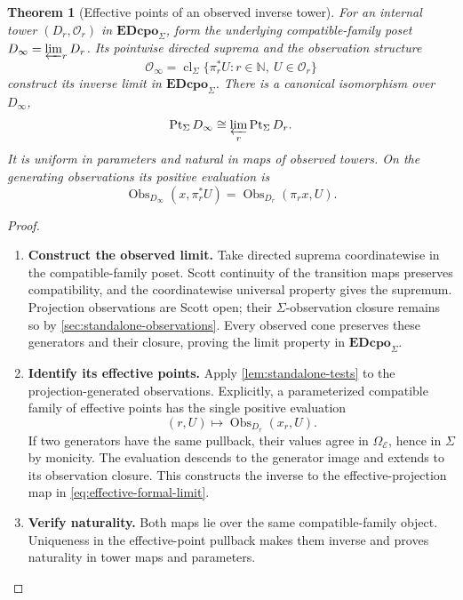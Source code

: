 \documentclass[11pt,a4paper]{article}
\numberwithin{algorithm}{section}
\numberwithin{equation}{section}
\newtheorem{theorem}{Theorem}[section]
\theoremstyle{definition}
\theoremstyle{remark}
\theoremstyle{plain}
\newcommand{\E}{\mathcal E}
\newcommand{\Truth}{\Omega_{\E}}
\newcommand{\N}{\mathbb N}
\newcommand{\Pt}{\operatorname{Pt}_{\Sigma}}
\newcommand{\ED}{\mathbf{EDcpo}_{\Sigma}}
\newcommand{\cl}{\operatorname{cl}}
\theoremstyle{definition}
\theoremstyle{plain}
\begin{document}
\begin{theorem}[Effective points of an observed inverse tower]
\label{thm:effective-formal-towers}
For an internal tower $(D_r,\mathcal O_r)$ in $\ED$, form the
underlying compatible-family poset $D_\infty=\varprojlim_rD_r$.
Its pointwise directed suprema and the observation structure
\begin{equation}\label{eq:formal-observation-closure}
 \mathcal O_\infty
 =\cl_\Sigma\{\pi_r^*U:r\in\N,\ U\in\mathcal O_r\}
\end{equation}
construct its inverse limit in $\ED$.  There is a canonical
isomorphism over $D_\infty$,
\begin{equation}\label{eq:effective-formal-limit}
 \Pt D_\infty\cong\varprojlim_r\Pt D_r.
\end{equation}
It is uniform in parameters and natural in maps of observed towers.
On the generating observations its positive evaluation is
\[
 \operatorname{Obs}_{D_\infty}(x,\pi_r^*U)
 =\operatorname{Obs}_{D_r}(\pi_rx,U).
\]
\end{theorem}
\begin{proof}\leavevmode
\begin{enumerate}[leftmargin=*,align=left]
\item \textbf{Construct the observed limit.}
Take directed suprema coordinatewise in the compatible-family
poset. Scott continuity of the transition maps preserves
compatibility, and the coordinatewise universal property gives
the supremum. Projection observations are Scott open; their
$\Sigma$-observation closure remains so by
\cref{sec:standalone-observations}. Every observed cone preserves
these generators and their closure, proving the limit property
in $\ED$.

\item \textbf{Identify its effective points.}
Apply \cref{lem:standalone-tests} to the projection-generated
observations. Explicitly, a parameterized compatible family of
effective points has the single positive evaluation
\[
 (r,U)\longmapsto\operatorname{Obs}_{D_r}(x_r,U).
\]
If two generators have the same pullback, their values agree in
$\Truth$, hence in $\Sigma$ by monicity. The evaluation descends
to the generator image and extends to its observation closure.
This constructs the inverse to the effective-projection map in
\eqref{eq:effective-formal-limit}.

\item \textbf{Verify naturality.}
Both maps lie over the same compatible-family object. Uniqueness
in the effective-point pullback makes them inverse and proves
naturality in tower maps and parameters.
\end{enumerate}
\end{proof}
\end{document}
